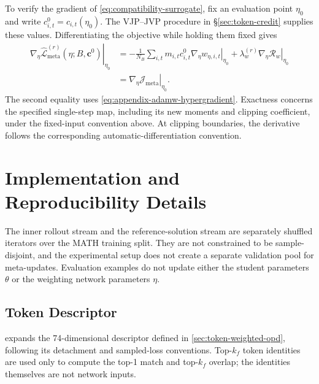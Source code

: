 \documentclass{article}
\theoremstyle{plain}
\theoremstyle{definition}
\theoremstyle{remark}
\begin{document}
To verify the gradient of \cref{eq:compatibility-surrogate}, fix an evaluation point \(\eta_0\) and write \(c^0_{i,t}=c_{i,t}(\eta_0)\). The VJP--JVP procedure in \S\ref{sec:token-credit} supplies these values. Differentiating the objective while holding them fixed gives
\[
\begin{aligned}
    \left.\nabla_\eta\widehat{\mathcal L}_{\mathrm{meta}}^{(r)}(\eta;B,\boldsymbol c^0)\right|_{\eta_0}
    &=-\frac{1}{N_B}\sum_{i,t}m_{i,t}c^0_{i,t}
      \left.\nabla_\eta w_{\eta,i,t}\right|_{\eta_0}
      +\lambda_w^{(r)}\left.\nabla_\eta\mathcal R_w\right|_{\eta_0}\\
    &=\left.\nabla_\eta\mathcal J_{\mathrm{meta}}\right|_{\eta_0}.
\end{aligned}
\]
The second equality uses \cref{eq:appendix-adamw-hypergradient}. Exactness concerns the specified single-step map, including its new moments and clipping coefficient, under the fixed-input convention above. At clipping boundaries, the derivative follows the corresponding automatic-differentiation convention.

\section{Implementation and Reproducibility Details}
\label{app:reproducibility}

The inner rollout stream and the reference-solution stream are separately shuffled iterators over the MATH training split.
They are not constrained to be sample-disjoint, and the experimental setup does not create a separate validation pool for meta-updates. Evaluation examples do not update either the student parameters \(\theta\) or the weighting network parameters \(\eta\).

\subsection{Token Descriptor}

 expands the 74-dimensional descriptor defined in \cref{sec:token-weighted-opd}, following its detachment and sampled-loss conventions. Top-\(k_f\) token identities are used only to compute the top-1 match and top-\(k_f\) overlap; the identities themselves are not network inputs.
\end{document}
